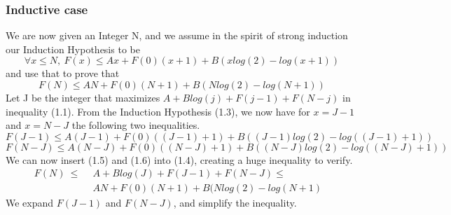 \subsubsection{Inductive case}
We are now given an Integer N, and we assume in the spirit of strong induction our Induction Hypothesis to be
\begin{equation}
\forall x \le N,\ F(x) \le Ax + F(0)(x+1) + B(xlog(2)-log(x+1)) 	
\end{equation}
and use that to prove that 
\begin{equation}
F(N) \le AN + F(0)(N+1) + B(Nlog(2)-log(N+1)) 	
\end{equation}
Let J be the integer that maximizes $A + Blog(j) + F(j-1) + F(N-j)$ in inequality (1.1). From the Induction Hypothesis (1.3), we now have for $x=J-1$ and $x=N-J$ the following two inequalities.
\begin{equation}
F(J-1) \le A(J-1) + F(0)((J-1)+1) + B((J-1)log(2)-log((J-1)+1)) 	
\end{equation}
\begin{equation}
F(N-J) \le A(N-J) + F(0)((N-J)+1) + B((N-J)log(2)-log((N-J)+1)) 	
\end{equation}
We can now insert (1.5) and (1.6) into (1.4), creating a huge inequality to verify.
\begin{align*}
F(N)\ \le&\ \  A + Blog(J) + F(J-1) + F(N-J) \le   & \\
&\ \  AN + F(0)(N+1) + B(Nlog(2)-log(N+1) & 
\end{align*}
We expand $F(J-1)$ and $F(N-J)$, and simplify the inequality.

